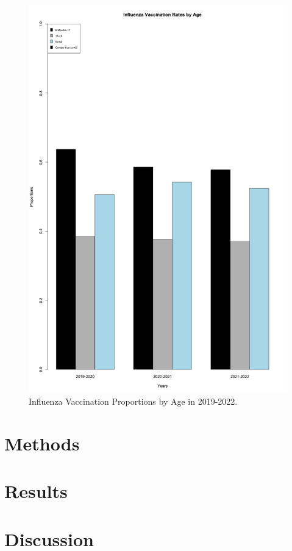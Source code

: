 \documentclass[12pt]{article}
\begin{document}
\begin{figure}[ht!]
  \centering
  \includegraphics[width= 125mm ,scale=.5]{age.png}
  \caption{Influenza Vaccination Proportions by Age in 2019-2022.}
  \label{fig:age}
\end{figure}

\clearpage
\section{Methods}
\label{sec:Methods}

\section{Results}
\label{sec:Results}

\section{Discussion}
\label{sec:Discussion}



\end{document}
